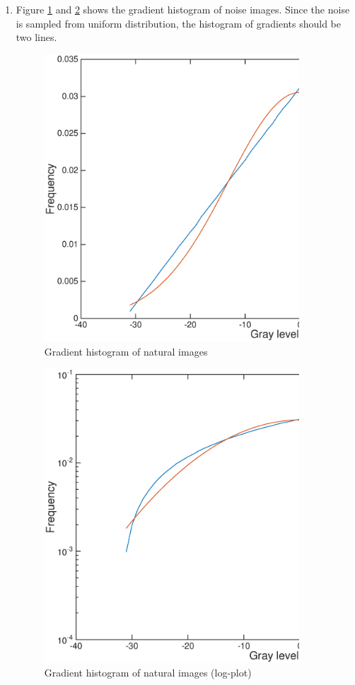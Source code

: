 \documentclass[11pt, oneside]{article}   	%
\begin{document}
\begin{enumerate}
\item Figure \ref{fig:step6124} and \ref{fig:step6124log} shows the gradient histogram of noise images. Since the noise is sampled from uniform distribution, the histogram of gradients should be two lines.
\begin{figure}[H]
	\centering
	\includegraphics[width=0.9\textwidth]{step6124}
	\caption{Gradient histogram of natural images}
	\label {fig:step6124}
\end{figure}
\begin{figure}[H]
	\centering
	\includegraphics[width=0.9\textwidth]{step6124log}
	\caption{Gradient histogram of natural images (log-plot)}
	\label {fig:step6124log}
\end{figure}


\end{enumerate}
\end{document}
